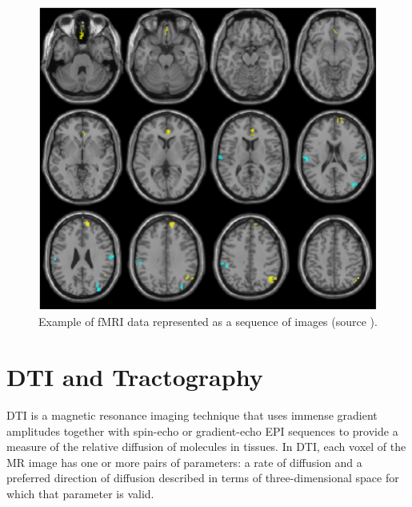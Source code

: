 \begin{figure}
	\centering
	\includegraphics[width=0.7\linewidth]{fig/fmridti/fmri.png}
	\caption{Example of fMRI data represented as a sequence of images (source \citet{quarantelli2013default}).}
	\label{fig:fmri_images}
\end{figure}

\section{DTI and Tractography}
DTI is a magnetic resonance imaging technique that uses immense gradient amplitudes together with spin-echo or gradient-echo EPI sequences to provide a measure of the relative diffusion of molecules in tissues. In DTI, each voxel of the MR image has one or more pairs of parameters: a rate of diffusion and a preferred direction of diffusion described in terms of three-dimensional space for which that parameter is valid. 

